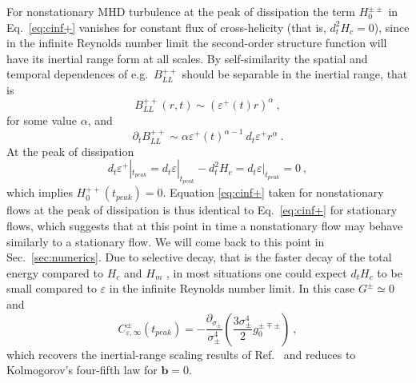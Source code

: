 \documentclass[aps,pre,onecolumn,superscriptaddress,notitlepage]{revtex4-1}
\newcommand{\Cinf}{C_{\varepsilon,\infty}}
\newcommand{\vep}{\varepsilon}
\newcommand{\sigmapm}{\sigma_\pm}
\renewcommand{\vec}[1]{\bm{#1}}
\newcommand{\beq}{\begin{equation}}
\newcommand{\eeq}{\end{equation}}
\begin{document}
For nonstationary MHD turbulence at the peak of dissipation the term $H_0^{\pm\pm}$ in Eq.~\eqref{eq:cinf+}
vanishes for constant flux of cross-helicity
(that is, $d_t^2 H_c = 0$),
since in the infinite Reynolds number limit the
second-order structure function will have its inertial range form
at all scales. By self-similarity the spatial and temporal dependences 
of e.g.~$B_{LL}^{++}$
should be separable in the inertial range, that is 
\beq
B_{LL}^{++}(r,t) \sim (\vep^+(t)r)^{\alpha} \ ,
\eeq
for some value $\alpha$, and
\beq
\partial_t B_{LL}^{++} \sim \alpha\vep^+(t)^{\alpha-1} \ d_t \vep^+ r^\alpha \ .
\eeq
At the peak of dissipation 
\beq
d_t \vep^+|_{t_{peak}} = 
d_t\vep|_{t_{peak}} -d_t^2 H_c = d_t\vep|_{t_{peak}} =0 \ ,
\eeq
which implies $H_0^{++}(t_{peak})=0$.
Equation \eqref{eq:cinf+} taken for nonstationary flows at the peak of 
dissipation is thus identical to Eq.~\eqref{eq:cinf+} for stationary flows,
which suggests that at this point in time a nonstationary flow 
may behave similarly to a stationary flow. We will come back to this point 
in Sec.~\ref{sec:numerics}. 
Due to selective decay, that is the faster decay of the total energy
compared to $H_c$ and $H_m$ \cite{Biskamp93}, in most situations one could expect $d_t H_c$ to
be small compared to $\vep$ in the infinite Reynolds number limit.
In this case $G^{\pm} \simeq 0$ and
\beq
\Cinf^\pm(t_{peak}) = -\frac{\partial_{\sigmapm}}{\sigmapm^4} \left(\frac{3\sigmapm^4}{2}g_0^{\pm\mp\pm} \right) \ ,
\eeq
which recovers the inertial-range scaling results of Ref.~\cite{Politano98} and reduces
to Kolmogorov's four-fifth law for $\vec{b}=0$.
\end{document}
